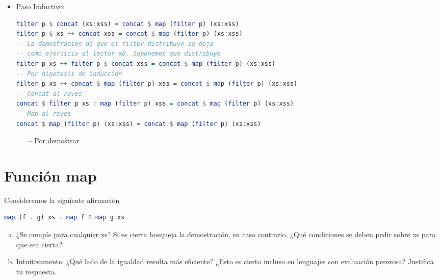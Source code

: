\documentclass[spanish,12pt,letterpaper]{article}
\begin{document}
\begin{itemize}
\begin{itemize}
  \item Paso Inductivo:
  \begin{lstlisting}[language=Haskell]
filter p $ concat (xs:xss) = concat $ map (filter p) (xs:xss)
filter p $ xs ++ concat xss = concat $ map (filter p) (xs:xss)
-- La demostracion de que el filter distribuye se deja
-- como ejercicio al lector xD. Suponemos que distribuye
filter p xs ++ filter p $ concat xss = concat $ map (filter p) (xs:xss)
-- Por hipotesis de induccion
filter p xs ++ concat $ map (filter p) xss = concat $ map (filter p) (xs:xss)
-- Concat al reves
concat $ filter p xs : map (filter p) xss = concat $ map (filter p) (xs:xss)
-- Map al reves
concat $ map (filter p) (xs:xss) = concat $ map (filter p) (xs:xss)

    \end{lstlisting}
  	\begin{itemize}
  	\item[--] Por demostrar
  	\end{itemize}
  \end{itemize}
\end{itemize}


\section{Función map}
Consideremos la siguiente afirmación
\begin{lstlisting}[language=Haskell]
  map (f . g) xs = map f $ map g xs
\end{lstlisting}
\begin{enumerate}[(a)]
\item ¿Se cumple para cualquier xs? Si es cierta bosqueja la demostración, en
  caso contrario, ¿Qué condiciones se deben pedir sobre xs para que sea cierta?
\item Intuitivamente, ¿Qué lado de la igualdad resulta más eficiente? ¿Esto es
  cierto incluso en lenguajes con evaluación perezosa? Justifica tu respuesta.
\end{enumerate}
\end{document}
